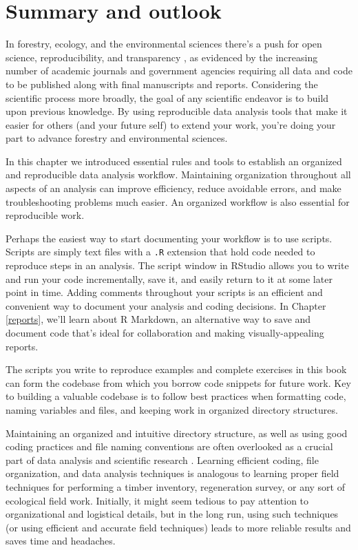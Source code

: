 \documentclass[
  11pt,
]{krantz}
\theoremstyle{definition}
\theoremstyle{definition}
\theoremstyle{definition}
\theoremstyle{definition}
\theoremstyle{remark}
\begin{document}
\hypertarget{summaryScripts}{%
\section{Summary and outlook}\label{summaryScripts}}

In forestry, ecology, and the environmental sciences there's a push for open science, reproducibility, and transparency \citep{ellison2010repeatability}, as evidenced by the increasing number of academic journals and government agencies requiring all data and code to be published along with final manuscripts and reports. Considering the scientific process more broadly, the goal of any scientific endeavor is to build upon previous knowledge. By using reproducible data analysis tools that make it easier for others (and your future self) to extend your work, you're doing your part to advance forestry and environmental sciences.

In this chapter we introduced essential rules and tools to establish an organized and reproducible data analysis workflow. Maintaining organization throughout all aspects of an analysis can improve efficiency, reduce avoidable errors, and make troubleshooting problems much easier. An organized workflow is also essential for reproducible work.

Perhaps the easiest way to start documenting your workflow is to use scripts. Scripts are simply text files with a \texttt{.R} extension that hold code needed to reproduce steps in an analysis. The script window in RStudio allows you to write and run your code incrementally, save it, and easily return to it at some later point in time. Adding comments throughout your scripts is an efficient and convenient way to document your analysis and coding decisions. In Chapter \ref{reports}, we'll learn about R Markdown, an alternative way to save and document code that's ideal for collaboration and making visually-appealing reports.

The scripts you write to reproduce examples and complete exercises in this book can form the codebase from which you borrow code snippets for future work. Key to building a valuable codebase is to follow best practices when formatting code, naming variables and files, and keeping work in organized directory structures.

Maintaining an organized and intuitive directory structure, as well as using good coding practices and file naming conventions are often overlooked as a crucial part of data analysis and scientific research \citep{wilson2017good}. Learning efficient coding, file organization, and data analysis techniques is analogous to learning proper field techniques for performing a timber inventory, regeneration survey, or any sort of ecological field work. Initially, it might seem tedious to pay attention to organizational and logistical details, but in the long run, using such techniques (or using efficient and accurate field techniques) leads to more reliable results and saves time and headaches.
\end{document}
